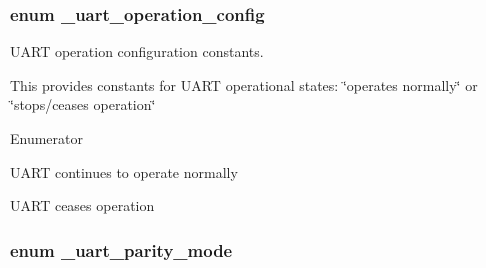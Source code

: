 \subsubsection[{\texorpdfstring{\+\_\+uart\+\_\+operation\+\_\+config}{_uart_operation_config}}]{\setlength{\rightskip}{0pt plus 5cm}enum {\bf \+\_\+uart\+\_\+operation\+\_\+config}}\hypertarget{group__uart__hal_ga6691a4a7f6d91eab489a02a8d8acbec9}{}\label{group__uart__hal_ga6691a4a7f6d91eab489a02a8d8acbec9}


U\+A\+RT operation configuration constants. 

This provides constants for U\+A\+RT operational states\+: \char`\"{}operates normally\char`\"{} or \char`\"{}stops/ceases operation\char`\"{} \begin{Desc}
\item[Enumerator]\par
\begin{description}
\item[{\em 
k\+Uart\+Operates\hypertarget{group__uart__hal_gga6691a4a7f6d91eab489a02a8d8acbec9a103d89ec75d4d974582f99f43bc64117}{}\label{group__uart__hal_gga6691a4a7f6d91eab489a02a8d8acbec9a103d89ec75d4d974582f99f43bc64117}
}]U\+A\+RT continues to operate normally \item[{\em 
k\+Uart\+Stops\hypertarget{group__uart__hal_gga6691a4a7f6d91eab489a02a8d8acbec9a0fa5187cd9ee9f9cde52d2730959d673}{}\label{group__uart__hal_gga6691a4a7f6d91eab489a02a8d8acbec9a0fa5187cd9ee9f9cde52d2730959d673}
}]U\+A\+RT ceases operation \end{description}
\end{Desc}
\subsubsection[{\texorpdfstring{\+\_\+uart\+\_\+parity\+\_\+mode}{_uart_parity_mode}}]{\setlength{\rightskip}{0pt plus 5cm}enum {\bf \+\_\+uart\+\_\+parity\+\_\+mode}}\hypertarget{group__uart__hal_gadf9f66755acc340eab030e1a48e35e10}{}\label{group__uart__hal_gadf9f66755acc340eab030e1a48e35e10}


